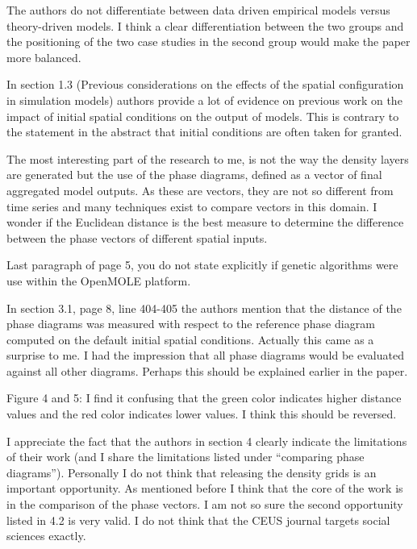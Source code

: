 \documentclass[11pt,a4paper,sans]{moderncv}        %
\begin{document}
The authors do not differentiate between data driven empirical models versus theory-driven models. I think a clear differentiation between the two groups and the positioning of the two case studies in the second group would make the paper more balanced.



In section 1.3 (Previous considerations on the effects of the spatial configuration in simulation models) authors provide a lot of evidence on previous work on the impact of initial spatial conditions on the output of models. This is contrary to the statement in the abstract that initial conditions are often taken for granted.

The most interesting part of the research to me, is not the way the density layers are generated but the use of the phase diagrams, defined as a vector of final aggregated model outputs. As these are vectors, they are not so different from time series and many techniques exist to compare vectors in this domain. I wonder if the Euclidean distance is the best measure to determine the difference between the phase vectors of different spatial inputs.

Last paragraph of page 5, you do not state explicitly if genetic algorithms were use within the OpenMOLE platform.

In section 3.1, page 8, line 404-405 the authors mention that the distance of the phase diagrams was measured with respect to the reference phase diagram computed on the default initial spatial conditions. Actually this came as a surprise to me. I had the impression that all phase diagrams would be evaluated against all other diagrams. Perhaps this should be explained earlier in the paper.



Figure 4 and 5: I find it confusing that the green color indicates higher distance values and the red color indicates lower values. I think this should be reversed.



I appreciate the fact that the authors in section 4 clearly indicate the limitations of their work (and I share the limitations listed under “comparing phase diagrams”). Personally I do not think that releasing the density grids is an important opportunity. As mentioned before I think that the core of the work is in the comparison of the phase vectors. I am not so sure the second opportunity listed in 4.2 is very valid. I do not think that the CEUS journal targets social sciences exactly.
\end{document}
